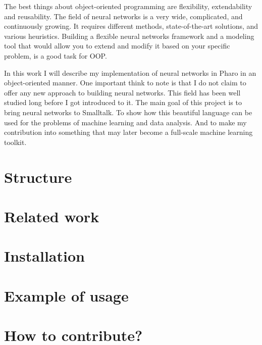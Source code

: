 The best things about object-oriented programming are flexibility, extendability and reusability. The field of neural networks is a very wide, complicated, and continuously growing. It requires different methods, state-of-the-art solutions, and various heuristics. Building a flexible neural networks framework and a modeling tool that would allow you to extend and modify it based on your specific problem, is a good task for OOP.

In this work I will describe my implementation of neural networks in Pharo in an object-oriented manner. One important think to note is that I do not claim to offer any new approach to building neural networks. This field has been well studied long before I got introduced to it. The main goal of this project is to bring neural networks to Smalltalk. To show how this beautiful language can be used for the problems of machine learning and data analysis. And to make my contribution into something that may later become a full-scale machine learning toolkit.

\section{Structure}


\section{Related work}


\section{Installation}


\section{Example of usage}


\section{How to contribute?}

